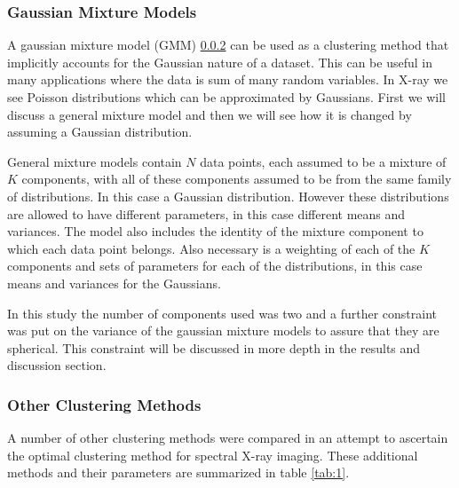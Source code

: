 \documentclass[a4paper,11pt]{article}
\begin{document}
\subsubsection{Gaussian Mixture Models}

A gaussian mixture model (GMM) \ref{} can be used as a clustering method that implicitly accounts for the Gaussian nature of a dataset. This can be useful in many applications where the data is sum of many random variables. In X-ray we see Poisson distributions which can be approximated by Gaussians. First we will discuss a general mixture model and then we will see how it is changed by assuming a Gaussian distribution.

General mixture models contain $N$ data points, each assumed to be a mixture of $K$ components, with all of these components assumed to be from the same family of distributions. In this case a Gaussian distribution. However these distributions are allowed to have different parameters, in this case different means and variances. The model also includes the identity of the mixture component to which each data point belongs. Also necessary is a weighting of each of the $K$ components and sets of parameters for each of the distributions, in this case means and variances for the Gaussians.

In this study the number of components used was two and a further constraint was put on the variance of the gaussian mixture models to assure that they are spherical. This constraint will be discussed in more depth in the results and discussion section.

\subsubsection{Other Clustering Methods}

A number of other clustering methods were compared in an attempt to ascertain the optimal clustering method for spectral X-ray imaging. These additional methods and their parameters are summarized in table \ref{tab:1}.
\end{document}
